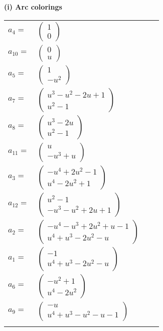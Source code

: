 \documentclass[1p]{elsarticle_modified}
\theoremstyle{definition}
\begin{document}
\flushleft \textbf{(i) Arc colorings}\\
\begin{tabular}{m{7pt} m{180pt} m{7pt} m{180pt} }
\flushright $a_{4}=$&$\begin{pmatrix}1\\0\end{pmatrix}$ \\
\flushright $a_{10}=$&$\begin{pmatrix}0\\u\end{pmatrix}$ \\
\flushright $a_{5}=$&$\begin{pmatrix}1\\- u^2\end{pmatrix}$ \\
\flushright $a_{7}=$&$\begin{pmatrix}u^3- u^2-2 u+1\\u^2-1\end{pmatrix}$ \\
\flushright $a_{8}=$&$\begin{pmatrix}u^3-2 u\\u^2-1\end{pmatrix}$ \\
\flushright $a_{11}=$&$\begin{pmatrix}u\\- u^3+u\end{pmatrix}$ \\
\flushright $a_{3}=$&$\begin{pmatrix}- u^4+2 u^2-1\\u^4-2 u^2+1\end{pmatrix}$ \\
\flushright $a_{12}=$&$\begin{pmatrix}u^2-1\\- u^3- u^2+2 u+1\end{pmatrix}$ \\
\flushright $a_{2}=$&$\begin{pmatrix}- u^4- u^3+2 u^2+u-1\\u^4+u^3-2 u^2- u\end{pmatrix}$ \\
\flushright $a_{1}=$&$\begin{pmatrix}-1\\u^4+u^3-2 u^2- u\end{pmatrix}$ \\
\flushright $a_{6}=$&$\begin{pmatrix}- u^2+1\\u^4-2 u^2\end{pmatrix}$ \\
\flushright $a_{9}=$&$\begin{pmatrix}- u\\u^4+u^3- u^2- u-1\end{pmatrix}$\\&\end{tabular}
\end{document}
